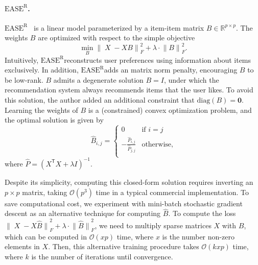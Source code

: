 \documentclass{article}
\DeclareMathOperator{\X}{\mathit{X}}
\newcommand{\easer}{$\text{EASE}^\text{R}$}
\newcommand{\norm}[1]{\ensuremath{\lVert #1 \rVert}}
\newcommand{\transpose}[1]{{#1}^\mathsf{T}}
\begin{document}
\paragraph*{\easer.}
\easer~\citep{steckEmbarrassinglyShallowAutoencoders2019}
is a linear model parameterized by a item-item matrix $B \in
	\mathbb{R}^{p \times p}$.
The weights $B$ are optimized with respect to the simple objective
 \begin{equation} \min_B \norm{\X - X B}_F^2 + \lambda \cdot \norm{B}_F^2
 \text{.
}
\end{equation}
Intuitively, \easer reconstructs user preferences using information about items
 exclusively.
In addition, \easer adds an matrix norm penalty, encouraging $B$ to be
 low-rank.
$B$ admits a degenerate solution $B = I$, under which the
recommendation system always recommends items that the user likes.
To avoid this solution, the author added an additional constraint that
 $\mathrm{diag}(B) = \mathbf{0}$.
Learning the weights of $B$ is a (constrained) convex optimization problem, and
 the optimal solution is given by  \begin{equation} \hat{B}_{i, j} =
	 \begin{cases} 0 & \text{if $i = j$} \\ -\frac{\hat{P}_{i, j}}{\hat{P}_{j, j}} &
               \text{otherwise,}     \\\end{cases} \end{equation} where $\hat{P} =
	 (\transpose{X} X + \lambda I)^{-1}$.

Despite its simplicity, computing this closed-form solution requires inverting
 an $p \times p$ matrix, taking $\mathcal{O}(p^3)$ time in a typical commercial
 implementation.
To save computational cost, we experiment with mini-batch stochastic gradient
 descent as an alternative technique for computing $\hat{B}$.
To compute the loss $\norm{\X - X \hat{B}}_F^2 + \lambda \cdot
	 \norm{\hat{B}}_F^2$, we need to multiply sparse matrices $X$ with $B$, which
 can be computed in $\mathcal{O}(x p)$ time, where $x$ is the number non-zero
 elements in $X$.
Then, this alternative training procedure takes $\mathcal{O}(kxp)$ time, where
 $k$ is the number of iterations until convergence.
\end{document}
